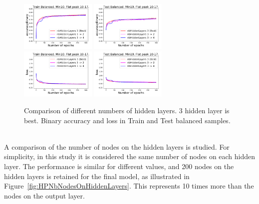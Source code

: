 \begin{figure}[htb]
\centering
\includegraphics[width=0.32\textwidth]{plots/plot_01_1_overlay_graph_accuracyBinary_Train_NbHiddenLayers.pdf}
\includegraphics[width=0.32\textwidth]{plots/plot_01_1_overlay_graph_accuracyBinary_Test_NbHiddenLayers.pdf}\\
\includegraphics[width=0.32\textwidth]{plots/plot_01_1_overlay_graph_loss_Train_NbHiddenLayers.pdf}
\includegraphics[width=0.32\textwidth]{plots/plot_01_1_overlay_graph_loss_Test_NbHiddenLayers.pdf}\\
\caption{Comparison of different numbers of hidden layers. 3 hidden layer is best. Binary accuracy and loss in Train and Test balanced samples.}
\label{fig:HPNbHiddenLayers}
\end{figure}

\ \\A comparison of the number of nodes on the hidden layers is studied. For simplicity, in this study it is considered the same number of nodes on each hidden layer. The performance is similar for different values, and 200 nodes on the hidden layers is retained for the final model, as illustrated in Figure~\ref{fig:HPNbNodesOnHiddenLayers}. This represents 10 times more than the nodes on the output layer.

